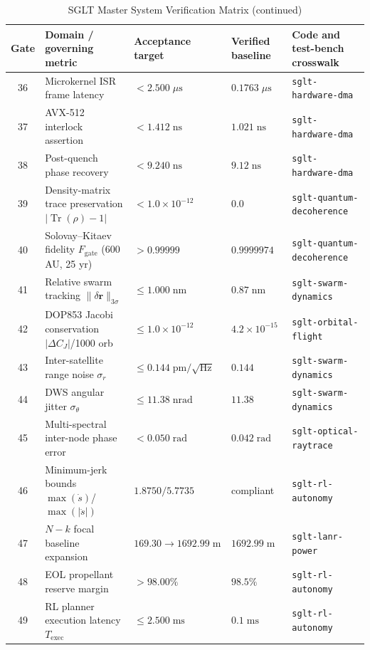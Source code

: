 \documentclass[10pt,twocolumn]{IEEEtran}
\begin{document}
\begin{table}[t]
\caption{SGLT Master System Verification Matrix (continued)}
\label{tab:master_verification_b}
\centering
\scriptsize
\begin{tabular}{@{}cp{4.3cm}p{3.5cm}p{3.3cm}p{3.6cm}@{}}
\toprule
Gate & Domain / governing metric & Acceptance target & Verified baseline & Code and test-bench crosswalk \\
\midrule
36 & Microkernel ISR frame latency & $<2.500\;\mu\mathrm{s}$ & $0.1763\;\mu\mathrm{s}$ & \texttt{sglt-hardware-dma} \\
37 & AVX-512 interlock assertion & $<1.412\;\mathrm{ns}$ & $1.021\;\mathrm{ns}$ & \texttt{sglt-hardware-dma} \\
38 & Post-quench phase recovery & $<9.240\;\mathrm{ns}$ & $9.12\;\mathrm{ns}$ & \texttt{sglt-hardware-dma} \\
39 & Density-matrix trace preservation $|\operatorname{Tr}(\rho)-1|$ & $<1.0\times10^{-12}$ & $0.0$ & \texttt{sglt-quantum-decoherence} \\
40 & Solovay--Kitaev fidelity $F_{\mathrm{gate}}$ (600 AU, 25 yr) & $>0.99999$ & $0.9999974$ & \texttt{sglt-quantum-decoherence} \\
41 & Relative swarm tracking $\|\delta\mathbf{r}\|_{3\sigma}$ & $\leq1.000\;\mathrm{nm}$ & $0.87\;\mathrm{nm}$ & \texttt{sglt-swarm-dynamics} \\
42 & DOP853 Jacobi conservation $|\Delta C_J|$/1000 orb & $\leq1.0\times10^{-12}$ & $4.2\times10^{-15}$ & \texttt{sglt-orbital-flight} \\
43 & Inter-satellite range noise $\sigma_r$ & $\leq0.144\;\mathrm{pm}/\sqrt{\mathrm{Hz}}$ & $0.144$ & \texttt{sglt-swarm-dynamics} \\
44 & DWS angular jitter $\sigma_\theta$ & $\leq11.38\;\mathrm{nrad}$ & $11.38$ & \texttt{sglt-swarm-dynamics} \\
45 & Multi-spectral inter-node phase error & $<0.050\;\mathrm{rad}$ & $0.042\;\mathrm{rad}$ & \texttt{sglt-optical-raytrace} \\
46 & Minimum-jerk bounds $\max(\dot{s})$/$\max(|\ddot{s}|)$ & $1.8750/5.7735$ & compliant & \texttt{sglt-rl-autonomy} \\
47 & $N-k$ focal baseline expansion & $169.30\to1692.99\;\mathrm{m}$ & $1692.99\;\mathrm{m}$ & \texttt{sglt-lanr-power} \\
48 & EOL propellant reserve margin & $>98.00\%$ & $98.5\%$ & \texttt{sglt-rl-autonomy} \\
49 & RL planner execution latency $T_{\mathrm{exec}}$ & $\leq2.500\;\mathrm{ms}$ & $0.1\;\mathrm{ms}$ & \texttt{sglt-rl-autonomy} \\

\end{tabular}
\end{table}
\end{document}
